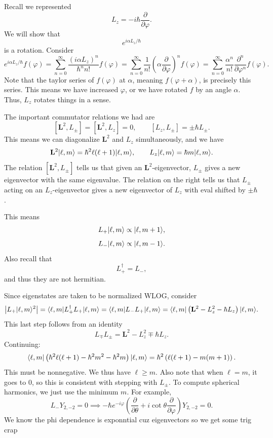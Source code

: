 Recall we represented
\[
	L_z=-i\hbar \frac{\partial }{\partial \varphi } 
.\]
We will show that
\[
	e^{i\alpha L_z/\hbar } 
\]
is a rotation. Consider
\[
	e^{i\alpha L_z/\hbar } f(\varphi )=\sum_{n=0}^{\infty} \frac{(i\alpha L_z)^n}{\hbar ^n n!} f(\varphi )=\sum_{n=0}^{\infty} \frac{1}{n!} \left( \alpha \frac{\partial }{\partial \varphi }  \right) ^n f(\varphi )=\sum_{n=0}^{\infty} \frac{\alpha ^n}{n!} \frac{\partial ^n}{\partial \varphi ^n} f(\varphi )
.\]
Note that the taylor series of $f(\varphi )$ at $\alpha $, meaning $f(\varphi +\alpha )$, is precisely this series. This means we have increased $\varphi $, or we have rotated $f$ by an angle $\alpha $. Thus, $L_z$ rotates things in a sense.

The important commutator relations we had are
\[
	\left[ \mathbf{L} ^2,L_{\pm}  \right] =\left[ \mathbf{L} ^2,L_z \right] =0,\qquad \left[ L_z,L_{\pm}  \right] =\pm \hbar L_{\pm} 
.\]
This means we can diagonalize $\mathbf{L} ^2$ and $L_z$ simultaneously, and we have
\[
	\mathbf{L} ^2\lvert\ell ,m\rangle =\hbar ^2\ell (\ell +1)\lvert\ell ,m\rangle ,\qquad L_z\lvert\ell ,m\rangle =\hbar m\lvert\ell ,m\rangle 
.\]
The relation $\left[ \mathbf{L} ^2,L_{\pm}  \right] $ tells us that given an $\mathbf{L} ^2$-eigenvector, $L_{\pm} $ gives a new eigenvector with the same eigenvalue. The relation on the right tells us that $L_{\pm} $ acting on an $L_z$-eigenvector gives a new eigenvector of $L_z$ with eval shifted by $\pm \hbar $.

This means
\[
	L_+\lvert\ell ,m\rangle\propto \lvert\ell ,m+1\rangle ,
\]
\[
	L_-\lvert\ell ,m\rangle \propto \lvert\ell ,m-1\rangle 
.\]
Also recall that
\[
	L_+^{\dagger} =L_-,
\]
and thus they are not hermitian.

Since eigenstates are taken to be normalized WLOG, consider
\[
	\left| L_+ \lvert\ell ,m\rangle ^2 \right| =\langle\ell ,m\rvert L_+^{\dagger} L_+\lvert\ell ,m\rangle =\langle\ell ,m\rvert L_-L_+\lvert\ell ,m\rangle =\langle\ell ,m\rvert \left( \mathbf{L} ^2-L_z^2-\hbar L_z \right) \lvert\ell ,m\rangle 
.\]
This last step follows from an identity
\[
	L_{\mp} L_{\pm} =\mathbf{L} ^2-L_z^2\mp \hbar L_z
.\]
Continuing:
\[
	\langle\ell ,m\rvert \left( \hbar ^2\ell (\ell +1)-\hbar ^2m^2-\hbar ^2m \right) \lvert\ell ,m\rangle=\hbar ^2\left( \ell (\ell +1)-m(m+1) \right)
.\]
This must be nonnegative. We thus have $\ell \geq m$. Also note that when $\ell =m$, it goes to 0, so this is consistent with stepping with $L_{\pm} $. To compute spherical harmonics, we just use the minimum $m$. For example,
\[
	L_- Y_{2,-2} =0\implies -\hbar e^{-i\varphi } \left( \frac{\partial }{\partial \theta } +i \cot \theta \frac{\partial }{\partial \varphi }  \right) Y_{2,-2} =0
.\]
We know the phi dependence is exponntial cuz eigenvectors so we get some trig crap
